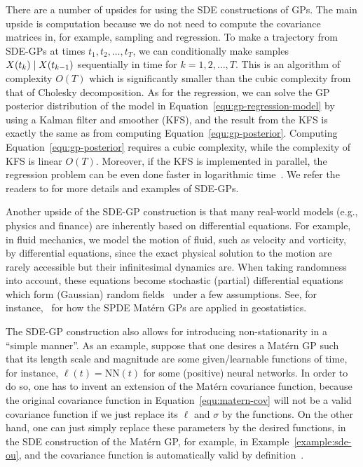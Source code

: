 \documentclass[]{article}
\begin{document}
There are a number of upsides for using the SDE constructions of GPs. The main upside is computation because we do not need to compute the covariance matrices in, for example, sampling and regression. To make a trajectory from SDE-GPs at times $t_1, t_2, \ldots, t_T$, we can conditionally make samples $X(t_k) {\;|\;} X(t_{k-1})$  sequentially in time for $k=1,2,\ldots,T$. This is an algorithm of complexity $O(T)$ which is significantly smaller than the cubic complexity from that of Cholesky decomposition. As for the regression, we can solve the GP posterior distribution of the model in Equation~\eqref{equ:gp-regression-model} by using a Kalman filter and smoother (KFS), and the result from the KFS is exactly the same as from computing Equation~\eqref{equ:gp-posterior}. Computing Equation~\eqref{equ:gp-posterior} requires a cubic complexity, while the complexity of KFS is linear $O(T)$. Moreover, if the KFS is implemented in parallel, the regression problem can be even done faster in logarithmic time~\citep{Corenflos2021SSGP}. We refer the readers to \citet{Sarkka2019} for more details and examples of SDE-GPs.

Another upside of the SDE-GP construction is that many real-world models (e.g., physics and finance) are inherently based on differential equations. For example, in fluid mechanics, we model the motion of fluid, such as velocity and vorticity, by differential equations, since the exact physical solution to the motion are rarely accessible but their infinitesimal dynamics are. When taking randomness into account, these equations become stochastic (partial) differential equations which form (Gaussian) random fields~\citep{Lord2014} under a few assumptions. See, for instance,~\citet{Lindgren2011} for how the SPDE Mat\'{e}rn GPs are applied in geostatistics.

The SDE-GP construction also allows for introducing non-stationarity in a ``simple manner''. As an example, suppose that one desires a Mat\'{e}rn GP such that its length scale and magnitude are some given/learnable functions of time, for instance, $\ell(t) = \mathrm{NN}(t)$ for some (positive) neural networks. In order to do so, one has to invent an extension of the Mat\'{e}rn covariance function, because the original covariance function in Equation~\eqref{equ:matern-cov} will not be a valid covariance function if we just replace its $\ell$ and $\sigma$ by the functions. On the other hand, one can just simply replace these parameters by the desired functions, in the SDE construction of the Mat\'{e}rn GP, for example, in Example~\ref{example:sde-ou}, and the covariance function is automatically valid by definition~\citep[see,][]{Zhao2021Thesis}.
\end{document}
